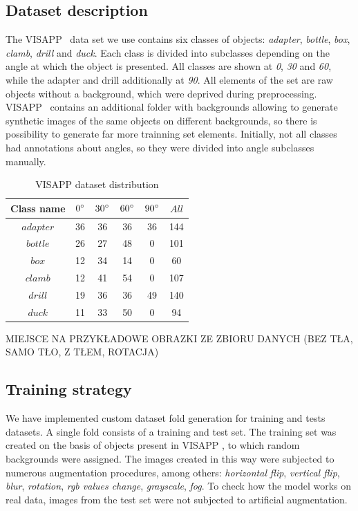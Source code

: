 \documentclass{article}
\begin{document}
\clearpage

\subsection{Dataset description}
\label{sec:dataset_desc}
The VISAPP~\cite{visapp} data set we use contains six classes of objects: \textit{adapter}, \textit{bottle}, \textit{box}, \textit{clamb}, \textit{drill} and \textit{duck}. Each class is divided into subclasses depending on the angle at which the object is presented. All classes are shown at \textit{0\degree}, \textit{30\degree} and \textit{60\degree}, while the adapter and drill additionally at \textit{90\degree}. All elements of the set are raw objects without a background, which were deprived during preprocessing. VISAPP~\cite{visapp} contains an additional folder with backgrounds allowing to generate synthetic images of the same objects on different backgrounds, so there is possibility to  generate far more trainning set elements. Initially, not all classes had annotations about angles, so they were divided into angle subclasses manually.

\begin{center}
\begin{table}[H]
\centering
\tiny \renewcommand{\arraystretch}{1.5}
\begin{tabular}
{ |c|c|c|c|c||c| } \hline Class name & $0\degree$ & $30\degree$ & $60\degree$ & $90\degree$ & $All$  \\ [1.05ex] \hline
$adapter$ &  36 & 36 & 36 & 36 & 144 \\ \hline
$bottle$ &  26 & 27 & 48 & 0 & 101 \\ \hline
$box$ &  12 & 34 & 14 & 0 & 60 \\ \hline
$clamb$ &  12 & 41 & 54 & 0 & 107 \\ \hline
$drill$ &  19 & 36 & 36 & 49 & 140 \\ \hline
$duck$ &  11 & 33 & 50 & 0 & 94 \\ \hline
\end{tabular}
\caption{VISAPP\cite{visapp} dataset distribution}
\label{tab:visapp_class_distribution}
\end{table}
\end{center}

MIEJSCE NA PRZYKŁADOWE OBRAZKI ZE ZBIORU DANYCH (BEZ TŁA, SAMO TŁO, Z TŁEM, ROTACJA)

\subsection{Training strategy}
\label{sec:train_strategy}
We have implemented custom dataset fold generation for training and tests datasets. A single fold consists of a training and test set. The training set was created on the basis of objects present in VISAPP \cite{visapp}, to which random backgrounds were assigned. The images created in this way were subjected to numerous augmentation procedures, among others: \textit{horizontal} \textit{flip}, \textit{vertical flip}, \textit{blur}, \textit{rotation}, \textit{rgb values change}, \textit{grayscale}, \textit{fog}. To check how the model works on real data, images from the test set were not subjected to artificial augmentation.
\end{document}
